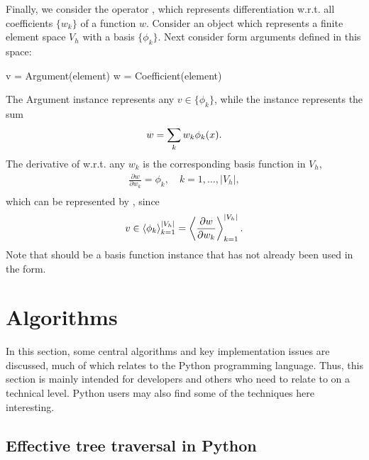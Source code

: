 Finally, we consider the operator , which represents
differentiation w.r.t. all coefficients $\{w_k\}$ of a function $w$.
Consider an object  which represents a finite element space
$V_h$ with a basis $\{\phi_k\}$.  Next consider form arguments defined
in this space:
\begin{uflcode}
v = Argument(element)
w = Coefficient(element)
\end{uflcode}
The Argument instance  represents any $v\in\{\phi_k\}$,
while the  instance  represents the sum\vspace*{-2pt}
\begin{align}
w = \sum_k w_k \phi_k(x).\vspace*{-2pt}
\end{align}
The derivative of  w.r.t. any $w_k$ is the corresponding basis function in $V_h$,\vspace*{-2pt}
\begin{align}
\frac{\partial w}{\partial w_k} = \phi_k, \quad k = 1, \ldots, |V_h|, \\
\end{align}
which can be represented by , since
\begin{align}
v \in \left\langle{ \phi_k }\right\rangle_{k=1}^{|V_h|} = \left\langle{ \frac{\partial w}{\partial w_k} }\right\rangle_{k=1}^{|V_h|}.
\end{align}
Note that  should be a basis function instance that has not
already been used in the form.

\section{Algorithms}
\label{ufl:sec:algorithms}

In this section, some central algorithms and key implementation issues
are discussed, much of which relates to the Python programming language.
Thus, this section is mainly intended for developers and others who need
to relate to \ufl{} on a technical level.  Python users may also find
some of the techniques here interesting.

\subsection{Effective tree traversal in Python}
\label{ufl:sec:traversal}

